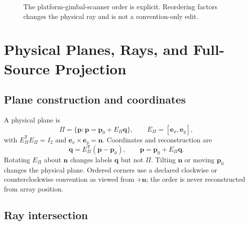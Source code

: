 \documentclass[journal]{IEEEtran}
\newcommand{\T}{^{\mathsf T}}
\begin{document}
\begin{figure}[t]
\centering
{}
\caption{The platform-gimbal-scanner order is explicit. Reordering factors
changes the physical ray and is not a convention-only edit.}
\label{fig:sensorchain}
\end{figure}

\section{Physical Planes, Rays, and Full-Source Projection}

\subsection{Plane construction and coordinates}

A physical plane is
\begin{equation}
\Pi=\{\bm p:\bm p=\bm p_0+E_\Pi\bm q\},\qquad
E_\Pi=[\bm e_x,\bm e_y],
\label{eq:plane}
\end{equation}
with $E_\Pi\T E_\Pi=I_2$ and
$\bm e_x\times\bm e_y=\bm n$. Coordinates and reconstruction are
\begin{equation}
\bm q=E_\Pi\T(\bm p-\bm p_0),\qquad
\bm p=\bm p_0+E_\Pi\bm q.
\label{eq:planeroundtrip}
\end{equation}
Rotating $E_\Pi$ about $\bm n$ changes labels $\bm q$ but not $\Pi$. Tilting
$\bm n$ or moving $\bm p_0$ changes the physical plane. Ordered corners use a
declared clockwise or counterclockwise convention as viewed from $+\bm n$;
the order is never reconstructed from array position.

\subsection{Ray intersection}
\end{document}
